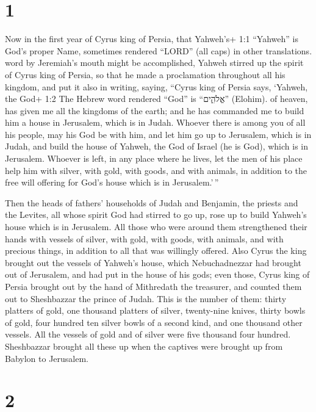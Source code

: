 \hypertarget{section}{%
\section{1}\label{section}}

 Now in the first year of Cyrus king of Persia, that
Yahweh's+ 1:1 ``Yahweh'' is God's proper Name, sometimes rendered
``LORD'' (all caps) in other translations. word by Jeremiah's mouth
might be accomplished, Yahweh stirred up the spirit of Cyrus king of
Persia, so that he made a proclamation throughout all his kingdom, and
put it also in writing, saying,  ``Cyrus king of Persia
says, `Yahweh, the God+ 1:2 The Hebrew word rendered ``God'' is
``אֱלֹהִ֑ים'' (Elohim). of heaven, has given me all the kingdoms of the
earth; and he has commanded me to build him a house in Jerusalem, which
is in Judah.  Whoever there is among you of all his people,
may his God be with him, and let him go up to Jerusalem, which is in
Judah, and build the house of Yahweh, the God of Israel (he is God),
which is in Jerusalem.  Whoever is left, in any place where
he lives, let the men of his place help him with silver, with gold, with
goods, and with animals, in addition to the free will offering for God's
house which is in Jerusalem.'\,''

 Then the heads of fathers' households of Judah and
Benjamin, the priests and the Levites, all whose spirit God had stirred
to go up, rose up to build Yahweh's house which is in Jerusalem.
 All those who were around them strengthened their hands
with vessels of silver, with gold, with goods, with animals, and with
precious things, in addition to all that was willingly offered.
 Also Cyrus the king brought out the vessels of Yahweh's
house, which Nebuchadnezzar had brought out of Jerusalem, and had put in
the house of his gods;  even those, Cyrus king of Persia
brought out by the hand of Mithredath the treasurer, and counted them
out to Sheshbazzar the prince of Judah.  This is the number
of them: thirty platters of gold, one thousand platters of silver,
twenty-nine knives,  thirty bowls of gold, four hundred ten
silver bowls of a second kind, and one thousand other vessels.
 All the vessels of gold and of silver were five thousand
four hundred. Sheshbazzar brought all these up when the captives were
brought up from Babylon to Jerusalem.

\hypertarget{section-1}{%
\section{2}\label{section-1}}

